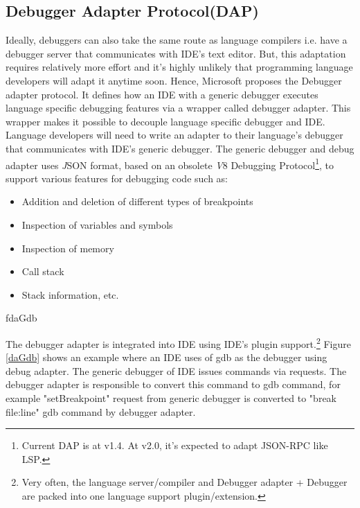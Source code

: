 \documentclass[dvipsnames]{article}
\newcommand{\loadFig}[1]{{%
  \expandafter\let\csname if#1\endcsname\iftrue%
  }
}%
\begin{document}
\subsection{Debugger Adapter Protocol(DAP)}
Ideally, debuggers can also take the same route as language compilers i.e. have a debugger server that communicates with IDE's text editor.
But, this adaptation requires relatively more effort and it's highly unlikely that programming language developers will adapt it anytime soon.
Hence, Microsoft proposes the Debugger adapter protocol.
It defines how an IDE with a generic debugger executes language specific debugging features via a wrapper called debugger adapter.
This wrapper makes it possible to decouple language specific debugger and IDE.
Language developers will need to write an adapter to their language's debugger that communicates with IDE's generic debugger.
The generic debugger and debug adapter uses {\textit JSON} format, based on an obsolete {\textit V8} Debugging Protocol\footnote{Current DAP is at v1.4. At v2.0, it's expected to adapt JSON-RPC like LSP.}, to support various features for debugging code such as:
\begin{itemize}
\item Addition and deletion of different types of breakpoints
\item Inspection of variables and symbols
\item Inspection of memory
\item Call stack
\item Stack information, etc.
\end{itemize}

\loadFig{daGdb}

The debugger adapter is integrated into IDE using IDE's plugin support.\footnote{Very often, the language server/compiler and Debugger adapter + Debugger are packed into one language support plugin/extension.}
Figure \ref{daGdb} shows an example where an IDE uses of gdb as the debugger using debug adapter. The generic debugger of IDE issues commands via requests.
The debugger adapter is responsible to convert this command to gdb command, for example "setBreakpoint" request from generic debugger is converted to "break file:line" gdb command by debugger adapter.
\end{document}

